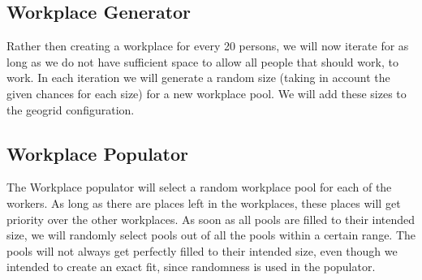 \subsection{Workplace Generator}
Rather then creating a workplace for every 20 persons, we will now iterate for as long as we do not have sufficient space to allow all people that should work, to work. In each iteration we will generate a random size (taking in account the given chances for each size) for a new workplace pool. We will add these sizes to the geogrid configuration.

\subsection{Workplace Populator}
The Workplace populator will select a random workplace pool for each of the workers. As long as there are places left in the workplaces, these places will get priority over the other workplaces. As soon as all pools are filled to their intended size, we will randomly select pools out of all the pools within a certain range. The pools will not always get perfectly filled to their intended size, even though we intended to create an exact fit, since randomness is used in the populator.

